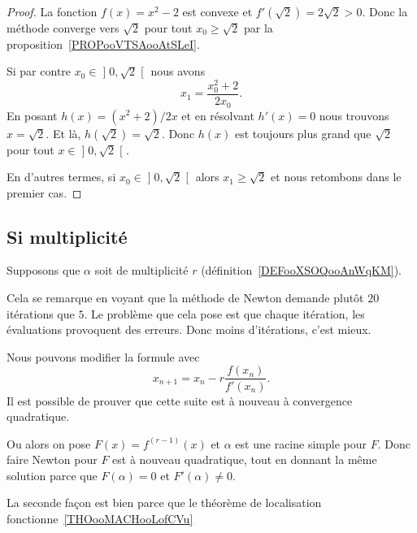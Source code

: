 \begin{proof}
	La fonction \( f(x)=x^2-2\) est convexe et \( f'(\sqrt{ 2 })=2\sqrt{ 2 }>0\). Donc la méthode converge vers \( \sqrt{ 2 }\) pour tout \( x_0\geq \sqrt{ 2 }\) par la proposition~\ref{PROPooVTSAooAtSLeI}.

	Si par contre \( x_0\in\mathopen] 0 , \sqrt{ 2 } \mathclose[\) nous avons
		\begin{equation}
			x_1=\frac{ x_0^2+2 }{ 2x_0 }.
		\end{equation}
		En posant \( h(x)=(x^2+2)/2x\) et en résolvant \( h'(x)=0\) nous trouvons \( x=\sqrt{ 2 }\). Et là, \( h(\sqrt{ 2 })=\sqrt{ 2 }\). Donc \( h(x)\) est toujours plus grand que \( \sqrt{ 2 }\) pour tout \( x\in\mathopen] 0 , \sqrt{ 2 } \mathclose[\).

		En d'autres termes, si \( x_0\in\mathopen] 0 , \sqrt{ 2 } \mathclose[\) alors \( x_1\geq \sqrt{ 2 }\) et nous retombons dans le premier cas.
\end{proof}

\subsection{Si multiplicité}

Supposons que \( \alpha\) soit de multiplicité \( r\) (définition~\ref{DEFooXSOQooAnWqKM}).

Cela se remarque en voyant que la méthode de Newton demande plutôt \( 20\) itérations que \( 5\). Le problème que cela pose est que chaque itération, les évaluations provoquent des erreurs. Donc moins d'itérations, c'est mieux.

Nous pouvons modifier la formule avec
\begin{equation}
	x_{n+1}=x_n-r\frac{ f(x_n) }{ f'(x_n) }.
\end{equation}
Il est possible de prouver que cette suite est à nouveau à convergence quadratique.

Ou alors on pose \( F(x)=f^{(r-1)}(x)\) et \( \alpha\) est une racine simple pour \( F\). Donc faire Newton pour \( F\) est à nouveau quadratique, tout en donnant la même solution parce que \( F(\alpha)=0\) et \( F'(\alpha)\neq 0\).

La seconde façon est bien parce que le théorème de localisation fonctionne~\ref{THOooMACHooLofCVu}

